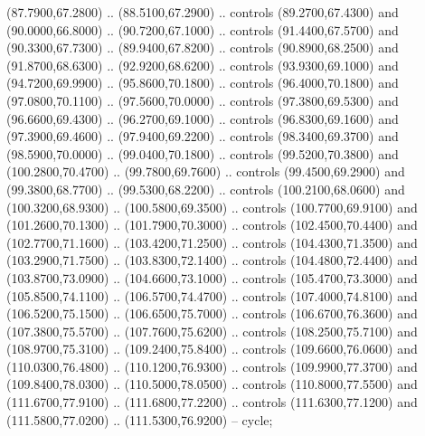 {\begin{scope}[y=0.80pt, x=0.80pt, yscale=-1, xscale=1, inner sep=0pt, outer sep=0pt, #1]
      (87.7900,67.2800) .. (88.5100,67.2900) .. controls (89.2700,67.4300) and
      (90.0000,66.8000) .. (90.7200,67.1000) .. controls (91.4400,67.5700) and
      (90.3300,67.7300) .. (89.9400,67.8200) .. controls (90.8900,68.2500) and
      (91.8700,68.6300) .. (92.9200,68.6200) .. controls (93.9300,69.1000) and
      (94.7200,69.9900) .. (95.8600,70.1800) .. controls (96.4000,70.1800) and
      (97.0800,70.1100) .. (97.5600,70.0000) .. controls (97.3800,69.5300) and
      (96.6600,69.4300) .. (96.2700,69.1000) .. controls (96.8300,69.1600) and
      (97.3900,69.4600) .. (97.9400,69.2200) .. controls (98.3400,69.3700) and
      (98.5900,70.0000) .. (99.0400,70.1800) .. controls (99.5200,70.3800) and
      (100.2800,70.4700) .. (99.7800,69.7600) .. controls (99.4500,69.2900) and
      (99.3800,68.7700) .. (99.5300,68.2200) .. controls (100.2100,68.0600) and
      (100.3200,68.9300) .. (100.5800,69.3500) .. controls (100.7700,69.9100) and
      (101.2600,70.1300) .. (101.7900,70.3000) .. controls (102.4500,70.4400) and
      (102.7700,71.1600) .. (103.4200,71.2500) .. controls (104.4300,71.3500) and
      (103.2900,71.7500) .. (103.8300,72.1400) .. controls (104.4800,72.4400) and
      (103.8700,73.0900) .. (104.6600,73.1000) .. controls (105.4700,73.3000) and
      (105.8500,74.1100) .. (106.5700,74.4700) .. controls (107.4000,74.8100) and
      (106.5200,75.1500) .. (106.6500,75.7000) .. controls (106.6700,76.3600) and
      (107.3800,75.5700) .. (107.7600,75.6200) .. controls (108.2500,75.7100) and
      (108.9700,75.3100) .. (109.2400,75.8400) .. controls (109.6600,76.0600) and
      (110.0300,76.4800) .. (110.1200,76.9300) .. controls (109.9900,77.3700) and
      (109.8400,78.0300) .. (110.5000,78.0500) .. controls (110.8000,77.5500) and
      (111.6700,77.9100) .. (111.6800,77.2200) .. controls (111.6300,77.1200) and
      (111.5800,77.0200) .. (111.5300,76.9200) -- cycle;


\end{scope}}

